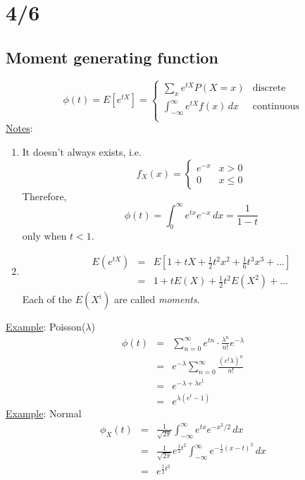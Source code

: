 \section*{4/6}
  \subsection*{Moment generating function}
    $$
      \phi(t) = E[e^{tX}] = 
        \begin{cases}
          \sum_{x}e^{tX}P(X=x) & \text{discrete}\\
          \int_{-\infty}^{\infty}e^{tX}f(x)\,dx & \text{continuous}\\
        \end{cases}
    $$
    \underline{Notes}: 
    \begin{enumerate}
      \item It doesn't always exists, i.e.
      $$
        f_X(x) = 
        \begin{cases}
          e^{-x} & x > 0\\
          0 & x \le 0
        \end{cases}
      $$
      Therefore,
      $$
        \phi(t) = \int_0^{\infty}e^{tx}e^{-x}\,dx = \frac{1}{1-t}
      $$
      only when $t < 1$.
      \item 
      \begin{eqnarray*}
        E(e^{tX}) 
        & = & E[1 + tX + \frac{1}{2}t^2x^2 + \frac{1}{6} t^3x^3 + \ldots]\\
        & = & 1 + tE(X) + \frac{1}{2}t^2E(X^2) + \ldots
      \end{eqnarray*}
      Each of the $E(X^i)$ are called \textit{moments}.
    \end{enumerate}
    \underline{Example}: Poisson($\lambda$)\\
      \begin{eqnarray*}
        \phi(t) 
        & = & \sum_{n = 0}^{\infty}e^{tn} \cdot \frac{\lambda^n}{n!}e^{-\lambda}\\
        & = & e^{-\lambda}\sum_{n = 0}^{\infty} \frac{(e^t\lambda)^n}{n!}\\
        & = & e^{-\lambda + \lambda e^t}\\
        & = & e^{\lambda(e^t - 1)}
      \end{eqnarray*}
    \underline{Example}: Normal
      \begin{eqnarray*}
        \phi_X(t) 
        & = & \frac{1}{\sqrt{2\pi}} \int_{-\infty}^{\infty}e^{tx}e^{-x^2/2}\,dx\\
        & = & \frac{1}{\sqrt{2\pi}}e^{\frac{1}{2}t^2}\int_{-\infty}^{\infty} e^{-\frac{1}{2}(x - t)^2}\,dx\\
        & = & e^{\frac{1}{2}t^2}\\
      \end{eqnarray*}
